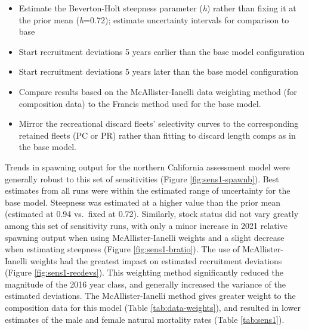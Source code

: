 \documentclass[11pt,
  english,
]{article}
\begin{document}
\begin{itemize}
\item

  Estimate the Beverton-Holt steepness parameter (\emph{h}) rather than fixing it at the prior mean (\emph{h}=0.72); estimate uncertainty intervals for comparison to base

  \tagmcend\tagstructend\tagstructend
\item

  Start recruitment deviations 5 years earlier than the base model configuration

  \tagmcend\tagstructend\tagstructend
\item

  Start recruitment deviations 5 years later than the base model configuration

  \tagmcend\tagstructend\tagstructend
\item

  Compare results based on the McAllister-Ianelli data weighting method (for composition data) to the Francis method used for the base model.

  \tagmcend\tagstructend\tagstructend
\item

  Mirror the recreational discard fleets' selectivity curves to the corresponding retained fleets (PC or PR) rather than fitting to discard length comps as in the base model.

  \tagmcend\tagstructend\tagstructend
\end{itemize}

\tagstructend

Trends in spawning output for the northern California assessment model were generally robust to this set of sensitivities (Figure \ref{fig:sens1-spawnb}). Best estimates from all runs were within the estimated range of uncertainty for the base model. Steepness was estimated at a higher value than the prior mean (estimated at 0.94 vs.~fixed at 0.72). Similarly, stock status did not vary greatly among this set of sensitivity runs, with only a minor increase in 2021 relative spawning output when using McAllister-Ianelli weights and a slight decrease when estimating steepness (Figure \ref{fig:sens1-bratio}). The use of McAllister-Ianelli weights had the greatest impact on estimated recruitment deviations (Figure \ref{fig:sens1-recdevs}). This weighting method significantly reduced the magnitude of the 2016 year class, and generally increased the variance of the estimated deviations. The McAllister-Ianelli method gives greater weight to the composition data for this model (Table \ref{tab:data-weights}), and resulted in lower estimates of the male and female natural mortality rates (Table \ref{tab:sens1}).
\end{document}
